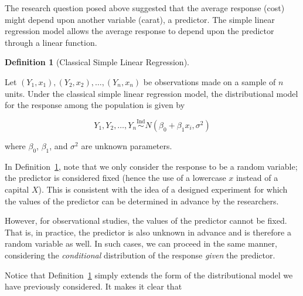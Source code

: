 \documentclass[
  letterpaper,
  DIV=11,
  numbers=noendperiod]{scrreprt}
\theoremstyle{definition}
\newtheorem{definition}{Definition}[chapter]
\theoremstyle{plain}
\theoremstyle{definition}
\theoremstyle{remark}
\begin{document}
The research question posed above suggested that the average response
(cost) might depend upon another variable (carat), a predictor. The
simple linear regression model allows the average response to depend
upon the predictor through a linear function.

\begin{definition}[Classical Simple Linear
Regression]\protect\hypertarget{def-classical-simple-regression}{}\label{def-classical-simple-regression}

Let
\(\left(Y_1, x_1\right), \left(Y_2, x_2\right), \dotsc, \left(Y_n, x_n\right)\)
be observations made on a sample of \(n\) units. Under the classical
simple linear regression model, the distributional model for the
response among the population is given by

\[Y_1, Y_2, \dotsc, Y_n \stackrel{\text{Ind}}{\sim} N\left(\beta_0 + \beta_1 x_i, \sigma^2\right)\]

where \(\beta_0\), \(\beta_1\), and \(\sigma^2\) are unknown parameters.

\end{definition}

\begin{tcolorbox}[enhanced jigsaw, breakable, colframe=quarto-callout-note-color-frame, titlerule=0mm, arc=.35mm, coltitle=black, opacitybacktitle=0.6, leftrule=.75mm, opacityback=0, left=2mm, toprule=.15mm, colbacktitle=quarto-callout-note-color!10!white, title=\textcolor{quarto-callout-note-color}{\faInfo}\hspace{0.5em}{Note}, bottomtitle=1mm, toptitle=1mm, rightrule=.15mm, bottomrule=.15mm, colback=white]

In Definition~\ref{def-classical-simple-regression}, note that we only
consider the response to be a random variable; the predictor is
considered fixed (hence the use of a lowercase \(x\) instead of a
capital \(X\)). This is consistent with the idea of a designed
experiment for which the values of the predictor can be determined in
advance by the researchers.

However, for observational studies, the values of the predictor cannot
be fixed. That is, in practice, the predictor is also unknown in advance
and is therefore a random variable as well. In such cases, we can
proceed in the same manner, considering the \emph{conditional}
distribution of the response \emph{given} the predictor.

\end{tcolorbox}

Notice that Definition~\ref{def-classical-simple-regression} simply
extends the form of the distributional model we have previously
considered. It makes it clear that
\end{document}
